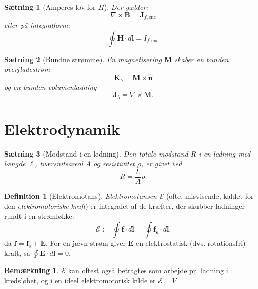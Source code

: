 \documentclass[]{article}
\newcommand{\hn}{\hat {\mathbf{n}}}
\newtheorem{theorem}{Sætning}
\theoremstyle{definition}
\newtheorem{definition}{Definition}
\newtheorem{remark}{Bemærkning}
\begin{document}
\begin{theorem}[Amperes lov for $H$]
	Der gælder:
	\begin{equation*}
		\nabla \times \mathbf{B} = \mathbf{J}_{f, \text{enc}}
	\end{equation*}
	eller på integralform:
	\begin{equation*}
		\oint \mathbf{H} \cdot d \mathbf{l} = I_{f, \text{enc}}
	\end{equation*}
\end{theorem}

\begin{theorem}[Bundne strømme]
	En magnetisering $\mathbf{M}$ skaber en bunden overfladestrøm
	\begin{equation*}
		\mathbf{K}_b = \mathbf{M} \times \hn
	\end{equation*}
	og en bunden volumenladning
	\begin{equation*}
		\mathbf{J}_b = \nabla \times \mathbf{M}.
	\end{equation*}
\end{theorem}

\section{Elektrodynamik}

\begin{theorem}[Modstand i en ledning]
	Den totale modstand $R$ i en ledning med længde $\ell$, tværsnitsareal $A$ og resistivitet $\rho$, er givet ved
	\begin{equation*}
		R = \frac{L}{A}\rho.
	\end{equation*}
\end{theorem}

\begin{definition}[Elektromotans]
	\emph{Elektromotansen} $\mathcal{E}$ (ofte, misvisende, kaldet for den \emph{elektromotoriske kraft}) er integralet af de kræfter, der skubber ladninger rundt i en strømløkke:
	\begin{equation*}
		\mathcal{E} := \oint \mathbf{f} \cdot d\mathbf{l} = \oint \mathbf{f_s} \cdot d\mathbf{l}.
	\end{equation*}
	da $\mathbf{f} = \mathbf{f}_s + \mathbf{E}$. For en jævn strøm giver $\mathbf{E}$ en elektrostatisk (dvs. rotationsfri) kraft, så  $\oint \mathbf{E} \cdot d\mathbf{l} = 0$.
\end{definition}

\begin{remark}
	$\mathcal{E}$ kan oftest også betragtes som arbejde pr. ladning i kredsløbet, og i en ideel elektromotorisk kilde er $\mathcal{E} = V$.
\end{remark}
\end{document}

